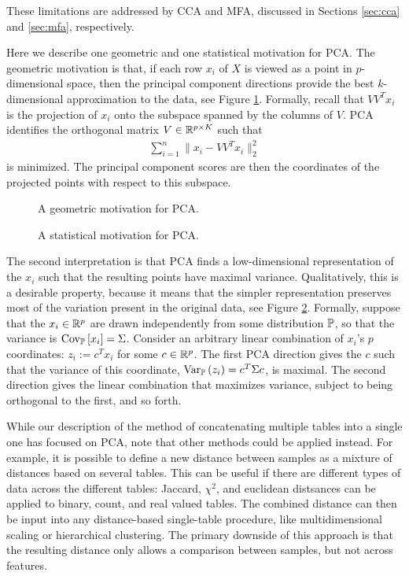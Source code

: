 \documentclass{article}
\begin{document}
These limitations are addressed by CCA and MFA, discussed in Sections
\ref{sec:cca} and \ref{sec:mfa}, respectively.

Here we describe one geometric and one statistical motivation for PCA.
The geometric motivation is that, if each
row $x_{i}$ of $X$ is viewed as a point in $p$-dimensional space, then
the principal component directions provide the best $k$-dimensional
approximation to the data, see Figure \ref{fig:pca-approx}. Formally,
recall that $VV^{T}x_{i}$ is the projection of $x_{i}$ onto the
subspace spanned by the columns of $V$. PCA identifies the orthogonal
matrix $V \in \reals^{p \times K}$ such that
\begin{align}
\sum_{i = 1}^{n}\|x_{i} - VV^{T} x_{i}\|_{2}^{2}
\end{align}
is minimized. The principal component scores are then the coordinates
of the projected points with respect to this subspace.

\begin{figure}
  \caption{A geometric motivation for PCA.}
  \label{fig:pca-approx}
\end{figure}

\begin{figure}
  \caption{A statistical motivation for PCA.}
  \label{fig:pca-var}
\end{figure}

The second interpretation is that PCA finds a low-dimensional
representation of the $x_{i}$ such that the resulting points have
maximal variance. Qualitatively, this is a desirable
property, because it means that the simpler representation
preserves most of the variation present in the original
data, see Figure \ref{fig:pca-var}. Formally, suppose that the
$x_{i}\in\reals^{p}$ are drawn independently from some distribution
$\P$, so that the variance is $\Covsubarg{\P}{x_{i}} = \Sigma$.
Consider an arbitrary linear combination of $x_{i}$'s $p$
coordinates: $z_{i} := c^{T}x_{i}$ for some $c \in \reals^{p}$. The
first PCA direction gives the $c$ such that the variance of this
coordinate, $\Varsubarg{\P}{z_{i}} = c^{T}\Sigma c$, is maximal. The
second direction gives the linear combination that maximizes variance,
subject to being orthogonal to the first, and so forth.

While our description of the method of concatenating multiple tables
into a single one has focused on PCA, note that other
methods could be applied instead. For example, it is possible to define a new
distance between samples as a mixture of distances based on several
tables. This can be useful if there are different types of data across
the different tables: Jaccard, $\chi^{2}$, and euclidean distsances
can be applied to binary, count, and real valued tables. The combined
distance can then be input into any distance-based single-table
procedure, like multidimensional scaling or hierarchical
clustering. The primary downside of this approach is that the
resulting distance only allows a comparison between samples, but not
across features.
\end{document}
